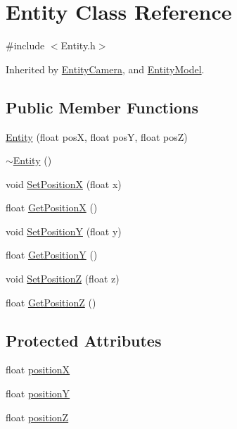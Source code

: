 \hypertarget{class_entity}{\section{Entity Class Reference}
\label{class_entity}
}


{\ttfamily \#include $<$Entity.\-h$>$}



Inherited by \hyperlink{class_entity_camera}{Entity\-Camera}, and \hyperlink{class_entity_model}{Entity\-Model}.

\subsection*{Public Member Functions}
\begin{DoxyCompactItemize}
\item 
\hyperlink{class_entity_a64e4457add48fc3f3e858668ee58dcee}{Entity} (float pos\-X, float pos\-Y, float pos\-Z)
\item 
\hyperlink{class_entity_adf6d3f7cb1b2ba029b6b048a395cc8ae}{$\sim$\-Entity} ()
\item 
void \hyperlink{class_entity_aaf3e06bde1b09426df70a82fd33cda4c}{Set\-Position\-X} (float x)
\item 
float \hyperlink{class_entity_a7b45eec5fd1c4bad68c913088fb3a580}{Get\-Position\-X} ()
\item 
void \hyperlink{class_entity_ac39410e534d19ddbfb255ccdf758b1b9}{Set\-Position\-Y} (float y)
\item 
float \hyperlink{class_entity_a05a8dc8fba5a84ca55f82a645f71ce69}{Get\-Position\-Y} ()
\item 
void \hyperlink{class_entity_a096584123b1047c33d253c1985401815}{Set\-Position\-Z} (float z)
\item 
float \hyperlink{class_entity_afac94b2a7de43504b1d503e07fbf55df}{Get\-Position\-Z} ()
\end{DoxyCompactItemize}
\subsection*{Protected Attributes}
\begin{DoxyCompactItemize}
\item 
float \hyperlink{class_entity_a7c0dee96eec0195e0d044431407b6324}{position\-X}
\item 
float \hyperlink{class_entity_afe0759b6ac8aeb85d8beb9292241f769}{position\-Y}
\item 
float \hyperlink{class_entity_a70f4db98655aeb2bb3a9ec9dea07db3e}{position\-Z}
\end{DoxyCompactItemize}


